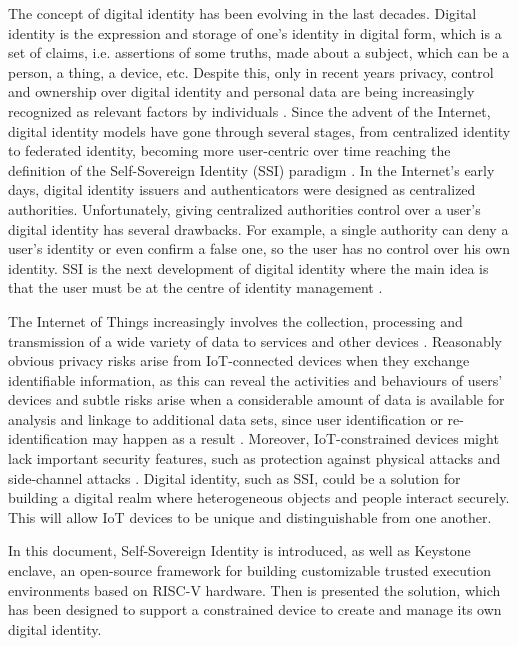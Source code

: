 
The concept of digital identity has been evolving in the last decades. Digital identity is the expression and storage of one's identity in digital form, which is a set of claims, i.e. assertions of some truths, made about a subject, which can be a person, a thing, a device, etc. Despite this, only in recent years privacy, control and ownership over digital identity and personal data are being increasingly recognized as relevant factors by individuals \cite{TheLawsOfIdentity}. 
Since the advent of the Internet, digital identity models have gone through several stages, from centralized identity to federated identity, becoming more user-centric over time reaching the definition of the Self-Sovereign Identity (SSI) paradigm \cite{ThePathToSSI}.
In the Internet's early days, digital identity issuers and authenticators were designed as centralized authorities. Unfortunately, giving centralized authorities control over a user's digital identity has several drawbacks. For example, a single authority can deny a user's identity or even confirm a false one, so the user has no control over his own identity. SSI is the next development of digital identity where the main idea is that the user must be at the centre of identity management \cite{ThePathToSSI}.


The Internet of Things increasingly involves the collection, processing and transmission of a wide variety of data to services and other devices \cite{wilson2018digital}. Reasonably obvious privacy risks arise from IoT-connected devices when they exchange identifiable information, as this can reveal the activities and behaviours of users' devices and subtle risks arise when a considerable amount of data is available for analysis and linkage to additional data sets, since user identification or re-identification may happen as a result \cite{wilson2018digital}. Moreover, IoT-constrained devices might lack important security features, such as protection against physical attacks \cite{IoTattacks} and side-channel attacks \cite{SideChannel, AC2}. Digital identity, such as SSI, could be a solution for building a digital realm where heterogeneous objects and people interact securely. This will allow IoT devices to be unique and distinguishable from one another.


In this document, Self-Sovereign Identity is introduced, as well as Keystone enclave, an open-source framework for building customizable trusted execution environments based on RISC-V hardware. Then is presented the solution, which has been designed to support a constrained device to create and manage its own digital identity. 



